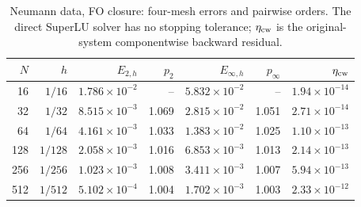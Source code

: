 \begin{table}[htbp]
\centering
\small
\setlength{\tabcolsep}{4pt}
\begin{tabular}{rrrrrrr}
\toprule
$N$ & $h$ & $E_{2,h}$ & $p_2$ & $E_{\infty,h}$ & $p_\infty$ & $\eta_{\rm cw}$ \\
\midrule
16 & $1/16$ & $1.786\times10^{-2}$ & -- & $5.832\times10^{-2}$ & -- & $1.94\times10^{-14}$ \\
32 & $1/32$ & $8.515\times10^{-3}$ & 1.069 & $2.815\times10^{-2}$ & 1.051 & $2.71\times10^{-14}$ \\
64 & $1/64$ & $4.161\times10^{-3}$ & 1.033 & $1.383\times10^{-2}$ & 1.025 & $1.10\times10^{-13}$ \\
128 & $1/128$ & $2.058\times10^{-3}$ & 1.016 & $6.853\times10^{-3}$ & 1.013 & $2.14\times10^{-13}$ \\
256 & $1/256$ & $1.023\times10^{-3}$ & 1.008 & $3.411\times10^{-3}$ & 1.007 & $5.94\times10^{-13}$ \\
512 & $1/512$ & $5.102\times10^{-4}$ & 1.004 & $1.702\times10^{-3}$ & 1.003 & $2.33\times10^{-12}$ \\
\bottomrule
\end{tabular}
\caption{Neumann data, FO closure: four-mesh errors and pairwise orders. The direct SuperLU solver has no stopping tolerance; $\eta_{\rm cw}$ is the original-system componentwise backward residual.}
\label{tab:refinement-neumann-first}
\end{table}
